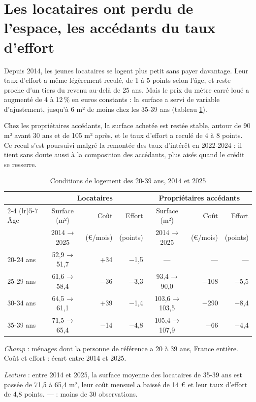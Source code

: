 \documentclass[11pt,a4paper]{article}
\begin{document}
\section{Les locataires ont perdu de l'espace, les accédants du taux d'effort}

Depuis 2014, les jeunes locataires se logent plus petit sans payer davantage. Leur taux d'effort a même légèrement reculé, de 1 à 5 points selon l'âge, et reste proche d'un tiers du revenu au-delà de 25 ans. Mais le prix du mètre carré loué a augmenté de 4 à 12\,\% en euros constants : la surface a servi de variable d'ajustement, jusqu'à 6 m² de moins chez les 35-39 ans (tableau \ref{tab:evol}).

Chez les propriétaires accédants, la surface achetée est restée stable, autour de 90 m² avant 30 ans et de 105 m² après, et le taux d'effort a reculé de 4 à 8 points. Ce recul s'est poursuivi malgré la remontée des taux d'intérêt en 2022-2024 : il tient sans doute aussi à la composition des accédants, plus aisés quand le crédit se resserre.

\begin{table}[H]
	\centering
	\small
	\setlength{\tabcolsep}{5pt}
	\begin{threeparttable}
		\caption{Conditions de logement des 20-39 ans, 2014 et 2025}
		\label{tab:evol}
		\begin{tabular}{lcrrcrr}
			\toprule
			& \multicolumn{3}{c}{Locataires} & \multicolumn{3}{c}{Propriétaires accédants} \\
			\cmidrule(lr){2-4} \cmidrule(lr){5-7}
			Âge & Surface (m²) & Coût & Effort & Surface (m²) & Coût & Effort \\
			& 2014 → 2025 & (€/mois) & (points) & 2014 → 2025 & (€/mois) & (points) \\
			\midrule
			20-24 ans & 52,9 → 51,7 & +34 & −1,5 & --- & --- & --- \\
			25-29 ans & 61,6 → 58,4 & −36 & −3,3 & 93,4 → 90,0 & −108 & −5,5 \\
			30-34 ans & 64,5 → 61,1 & +39 & −1,4 & 103,6 → 103,5 & −290 & −8,4 \\
			35-39 ans & 71,5 → 65,4 & −14 & −4,8 & 105,4 → 107,9 & −66 & −4,4 \\
			\bottomrule
		\end{tabular}
		\begin{tablenotes}[flushleft]\scriptsize
			\item \textit{Champ} : ménages dont la personne de référence a 20 à 39 ans, France entière. Coût et effort : écart entre 2014 et 2025.
			\item \textit{Lecture} : entre 2014 et 2025, la surface moyenne des locataires de 35-39 ans est passée de 71,5 à 65,4 m², leur coût mensuel a baissé de 14 € et leur taux d'effort de 4,8 points. --- : moins de 30 observations.
		\end{tablenotes}
	\end{threeparttable}
\end{table}
\end{document}
